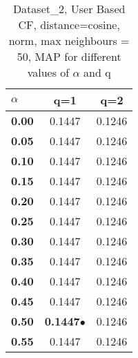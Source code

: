 \begin{table}
\begin{center}
\begin{tabular}{ | l || c | c |}
\hline
\textbf{$\alpha$} & \textbf{q=1} & \textbf{q=2} \\
\hline
\textbf{0.00} & 0.1447 & 0.1246\\
\hline
\textbf{0.05} & 0.1447 & 0.1246\\
\hline
\textbf{0.10} & 0.1447 & 0.1246\\
\hline
\textbf{0.15} & 0.1447 & 0.1246\\
\hline
\textbf{0.20} & 0.1447 & 0.1246\\
\hline
\textbf{0.25} & 0.1447 & 0.1246\\
\hline
\textbf{0.30} & 0.1447 & 0.1246\\
\hline
\textbf{0.35} & 0.1447 & 0.1246\\
\hline
\textbf{0.40} & 0.1447 & 0.1246\\
\hline
\textbf{0.45} & 0.1447 & 0.1246\\
\hline
\textbf{0.50} & \textbf{0.1447}$\bullet$ & 0.1246\\
\hline
\textbf{0.55} & 0.1447 & 0.1246\\
\hline
\end{tabular}
\caption{Dataset\_2, User Based CF, distance=cosine, norm, max neighbours = 50, MAP for different values of $\alpha$ and q}
\label{table:MAP_Dataset_2_ucf_cosine_norm_mnn=50}
\end{center}
\end{table}

